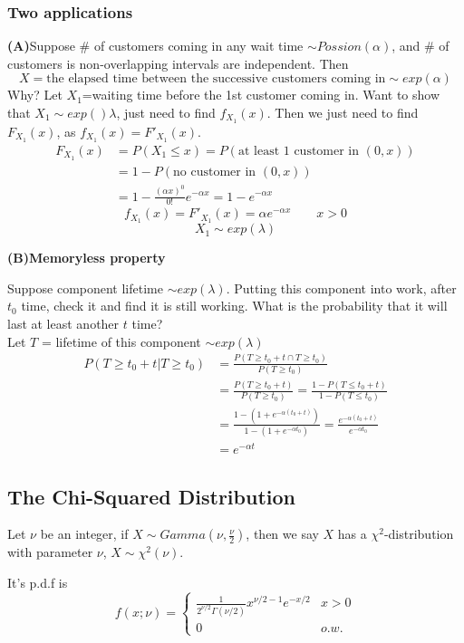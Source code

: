 \subsubsection{Two applications}
\textbf{(A)}Suppose \# of customers coming in any wait time $\sim Possion(\alpha)$, and \# of customers is non-overlapping intervals are independent. Then
\[X= \text{the elapsed time between the successive customers coming in}\sim exp(\alpha)\]
Why? Let $X_1$=waiting time before the 1st customer coming in. Want to show that $X_1 \sim exp()\lambda$, just need to find $f_{X_1}(x)$. Then we just need to find $F_{X_1}(x)$, as $f_{X_1}(x)=F'_{X_1}(x)$.
\begin{align*}
F_{X_1}(x)&= P(X_1\leq x)=P(\text{at least 1 customer in }(0,x)) \\
&= 1-P(\text{no customer in }(0,x)) \\
&=1-\frac{(\alpha x)^0}{0!}e^{-\alpha x}=1-e^{-\alpha x}
\end{align*}
\[f_{X_1}(x)=F'_{X_1}(x)=\alpha e^{-\alpha x} \qquad x>0\]
\[X_1 \sim exp(\lambda)\]


\textbf{(B)Memoryless property}

Suppose component lifetime $\sim exp(\lambda)$. Putting this component into work, after $t_0$ time, check it and find it is still working. What is the probability that it will last at least another $t$ time?\\
Let $T$ = lifetime of this component $\sim exp(\lambda)$
\begin{align*}
P(T\geq t_0+t|T \geq t_0)&=\frac{P(T\geq t_0+t \cap T \geq t_0)}{P(T \geq t_0)} \\
&=\frac{P(T\geq t_0+t)}{P(T \geq t_0)}=\frac{1-P(T\leq t_0+t)}{1-P(T \leq t_0)} \\
&=\frac{1-(1+e^{-\alpha(t_0+t)})}{1-(1+e^{-\alpha t_0})}=\frac{e^{-\alpha(t_0+t)}}{e^{-\alpha t_0}} \\
&=e^{-\alpha t}
\end{align*}

\subsection{The Chi-Squared Distribution}
Let $\nu$ be an integer, if $X \sim Gamma(\nu,\frac{\nu}{2})$, then we say $X$ has a $\chi^2$-distribution with parameter $\nu$, $X \sim \chi^2 (\nu)$.

It's p.d.f is
\[f(x;\nu)=\begin{cases}
\frac{1}{2^{\nu/2}\Gamma(\nu/2)} x^{\nu/2-1}e^{-x/2} & x>0 \\
0 & o.w.
\end{cases}\]


